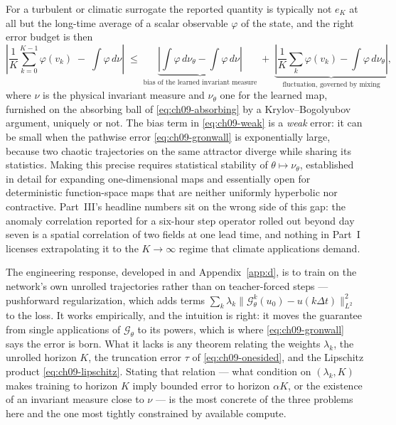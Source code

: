 For a turbulent or climatic surrogate the reported quantity is typically not
$e_K$ at all but the long-time average of a scalar observable $\varphi$ of the
state, and the right error budget is then
\begin{equation}
  \left|\frac{1}{K}\sum_{k=0}^{K-1}\varphi(v_k)\;-\;\int\varphi\,d\nu\right|
  \;\le\;
  \underbrace{\left|\int\varphi\,d\nu_\theta-\int\varphi\,d\nu\right|}_{\text{bias of the learned invariant measure}}
  \;+\;
  \underbrace{\left|\frac1K\sum_k\varphi(v_k)-\int\varphi\,d\nu_\theta\right|}_{\text{fluctuation, governed by mixing}},
  \label{eq:ch09-weak}
\end{equation}
where $\nu$ is the physical invariant measure and $\nu_\theta$ one for the
learned map, furnished on the absorbing ball of \eqref{eq:ch09-absorbing} by a
Krylov--Bogolyubov argument, uniquely or not. The bias term in
\eqref{eq:ch09-weak} is a \emph{weak} error: it can be small when the pathwise
error \eqref{eq:ch09-gronwall} is exponentially large, because two chaotic
trajectories on the same attractor diverge while sharing its statistics. Making
this precise requires statistical stability of $\theta\mapsto\nu_\theta$,
established in detail for expanding one-dimensional maps and
essentially open for deterministic function-space maps that are neither uniformly
hyperbolic nor contractive.
Part~III's headline numbers sit on the wrong side of this gap: the
anomaly correlation reported for a six-hour step operator rolled out beyond day
seven \cite{pathak2022fourcastnet} is a spatial correlation of two fields at one
lead time, and nothing
in Part~I licenses extrapolating it to the $K\to\infty$ regime that climate
applications demand.

The engineering response, developed in
 and
Appendix~\ref{app:d}, is
to train on the network's own unrolled trajectories rather than on teacher-forced
steps --- pushforward regularization, which adds terms
$\sum_{k}\lambda_k\|\mathcal{G}_\theta^{k}(u_0)-u(k\Delta t)\|^2_{L^2}$ to the
loss. It works empirically, and the intuition is right: it moves the
guarantee from single applications of $\mathcal{G}_\theta$ to its
powers, which is where \eqref{eq:ch09-gronwall} says the error is born. What it
lacks is any theorem relating the weights $\lambda_k$, the unrolled horizon $K$,
the truncation error $\tau$ of \eqref{eq:ch09-onesided}, and the
Lipschitz product \eqref{eq:ch09-lipschitz}. Stating that relation --- what
condition on $(\lambda_k,K)$ makes training to horizon $K$ imply bounded error to
horizon $\alpha K$, or the existence of an invariant measure close to $\nu$ ---
is the most concrete of the three problems here and the one most tightly
constrained by available compute.

